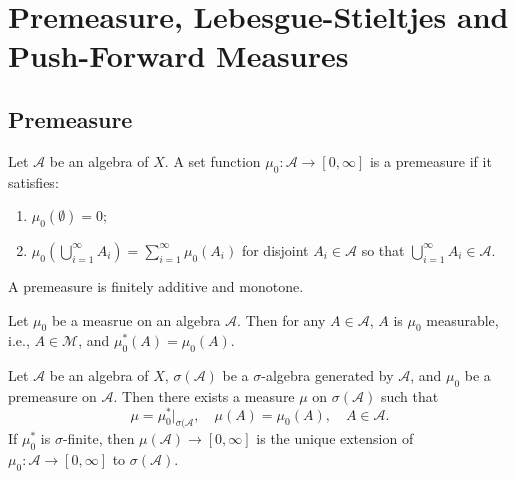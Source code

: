 \documentclass[class=book, crop=false]{standalone}
\begin{document}
    \section{Premeasure, Lebesgue-Stieltjes and Push-Forward Measures}
        \subsection{Premeasure}
        \begin{definition}[Premeasure]
            Let $\mathscr{A}$ be an algebra of $X$. A set function $\mu_0 : \mathscr{A} \rightarrow [0, \infty]$ is a premeasure if it satisfies:
            \begin{enumerate}
                \item $\mu_0(\emptyset) = 0$;
                \item $\mu_0\left(\bigcup^{\infty}_{i = 1} A_i\right) = \sum^{\infty}_{i = 1} \mu_0(A_i)$ for disjoint $A_i \in \mathscr{A}$ so that $\bigcup^{\infty}_{i = 1} A_i \in \mathscr{A}$.
            \end{enumerate}
        \end{definition}

        \begin{theorem}
            A premeasure is finitely additive and monotone.
        \end{theorem}

        \begin{theorem}
            Let $\mu_0$ be a measrue on an algebra $\mathscr{A}$. Then for any $A \in \mathscr{A}$, $A$ is $\mu_0$ measurable, i.e., $A \in \mathscr{M}$, and $\mu^*_0(A) = \mu_0(A)$.
        \end{theorem}

        \begin{theorem}
            Let $\mathscr{A}$ be an algebra of $X$, $\sigma(\mathscr{A})$ be a $\sigma$-algebra generated by $\mathscr{A}$, and $\mu_0$ be a premeasure on $\mathscr{A}$. Then there exists a measure $\mu$ on $\sigma(\mathscr{A})$ such that
            \begin{equation*}
                \mu = \mu^*_0 |_{\sigma(\mathscr{A}}, \quad \mu(A) = \mu_0(A), \quad A \in \mathscr{A}.
            \end{equation*}
            If $\mu^*_0$ is $\sigma$-finite, then $\mu(\mathscr{A}) \rightarrow [0, \infty]$ is the unique extension of $\mu_0 : \mathscr{A} \rightarrow [0, \infty]$ to $\sigma(\mathscr{A})$.
        \end{theorem}
        
\end{document}
